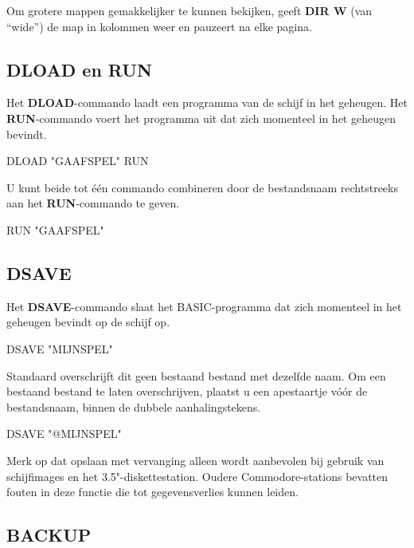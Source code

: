 Om grotere mappen gemakkelijker te kunnen bekijken, geeft {\bf DIR W} (van ``wide'') de map in kolommen weer en pauzeert na elke pagina.

\subsection{DLOAD en RUN}

Het {\bf DLOAD}-commando laadt een programma van de schijf in het geheugen. Het {\bf RUN}-commando voert het programma uit dat zich momenteel in het geheugen bevindt.

\begin{screencode}
DLOAD "GAAFSPEL"
RUN
\end{screencode}

U kunt beide tot één commando combineren door de bestandsnaam rechtstreeks aan het {\bf RUN}-commando te geven.

\begin{screencode}
RUN "GAAFSPEL"
\end{screencode}

\subsection{DSAVE}

Het {\bf DSAVE}-commando slaat het BASIC-programma dat zich momenteel in het geheugen bevindt op de schijf op.

\begin{screencode}
DSAVE "MIJNSPEL"
\end{screencode}

Standaard overschrijft dit geen bestaand bestand met dezelfde naam. Om een bestaand bestand te laten overschrijven, plaatst u een apestaartje vóór de bestandsnaam, binnen de dubbele aanhalingstekens.

\begin{screencode}
DSAVE "@MIJNSPEL"
\end{screencode}

Merk op dat opslaan met vervanging alleen wordt aanbevolen bij gebruik van schijfimages en het 3.5"-diskettestation. Oudere Commodore-stations bevatten fouten in deze functie die tot gegevensverlies kunnen leiden.

\subsection{BACKUP}

